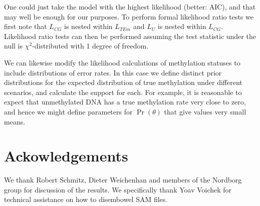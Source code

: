 \documentclass[12pt,longbibliography]{article}
\begin{document}
One could just take the model with the highest likelihood (better: AIC), and that may well be enough for our purposes. To perform formal likelihood ratio tests we first note that $L_{CG}$ is nested within $L_{TEm}$ and $L_{U}$ is nested within $L_{CG}$. Likelihood ratio tests can then be performed assuming the test statistic under the null is $\chi^2$-distributed 
with 1 degree of freedom.



We can likewise modify the likelihood calculations of methylation statuses to include distributions of error rates.
In this case we define distinct prior distributions for the expected distribution of true methylation under different scenarios, and calculate the support for each.
For example, it is reasonable to expect that unmethylated DNA has a true methylation rate very close to zero, and hence we might define parameters for $\Pr(\theta)$ that give values very small means.

\section{Ackowledgements}

We thank Robert Schmitz, Dieter Weichenhan and members of the Nordborg group for discussion of the results.
We specifically thank Yoav Voichek for technical assistance on how to disembowel SAM files.

\printbibliography %
\end{document}
